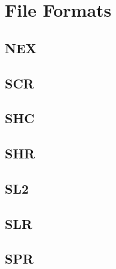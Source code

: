 \section{File Formats}
\subsection{NEX}
\subsection{SCR}
\subsection{SHC}
\subsection{SHR}
\subsection{SL2}
\subsection{SLR}
\subsection{SPR}

